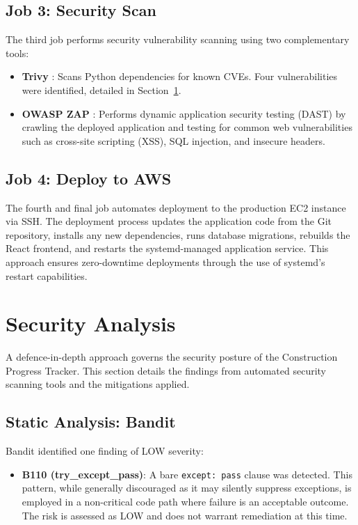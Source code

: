 \documentclass[conference]{IEEEtran}
\begin{document}
\subsection{Job 3: Security Scan}

The third job performs security vulnerability scanning using two complementary tools:

\begin{itemize}[noitemsep]
    \item \textbf{Trivy} \cite{aqua2024trivy}: Scans Python dependencies for known CVEs. Four vulnerabilities were identified, detailed in Section~\ref{sec:security}.
    \item \textbf{OWASP ZAP} \cite{owasp2024zap}: Performs dynamic application security testing (DAST) by crawling the deployed application and testing for common web vulnerabilities such as cross-site scripting (XSS), SQL injection, and insecure headers.
\end{itemize}

\subsection{Job 4: Deploy to AWS}

The fourth and final job automates deployment to the production EC2 instance via SSH. The deployment process updates the application code from the Git repository, installs any new dependencies, runs database migrations, rebuilds the React frontend, and restarts the systemd-managed application service. This approach ensures zero-downtime deployments through the use of systemd's restart capabilities.

\section{Security Analysis}
\label{sec:security}

A defence-in-depth approach governs the security posture of the Construction Progress Tracker. This section details the findings from automated security scanning tools and the mitigations applied.

\subsection{Static Analysis: Bandit}

Bandit identified one finding of LOW severity:

\begin{itemize}[noitemsep]
    \item \textbf{B110 (try\_except\_pass)}: A bare \texttt{except: pass} clause was detected. This pattern, while generally discouraged as it may silently suppress exceptions, is employed in a non-critical code path where failure is an acceptable outcome. The risk is assessed as LOW and does not warrant remediation at this time.
\end{itemize}
\end{document}
